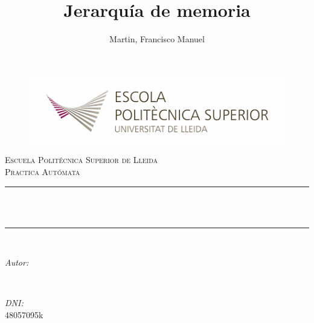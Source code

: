 \documentclass{article}
\title{Jerarquía de memoria}
\author{Martin, Francisco Manuel
}
\makeatletter
\let\thetitle\@title
\let\theauthor\@author
\let\thedate\@date
\makeatother
\begin{document}
    \begin{titlepage}
        \begin{figure}[h]

            \includegraphics[scale=0.38]{1}
        \end{figure}
        \centering
        \vspace*{0.5 cm}

        \textsc{\LARGE Escuela Politécnica Superior de Lleida}\\[2.0 cm]    %
        \textsc{\large Practica Autómata}\\[0.5 cm]                %
        \rule{\linewidth}{0.2 mm} \\[0.4 cm]
        { \huge \bfseries \thetitle}\\
        \rule{\linewidth}{0.2 mm} \\[1.5 cm]

        \begin{minipage}{0.4\textwidth}
            \begin{flushleft}
                \large
                \emph{Autor:}\\
                \theauthor
            \end{flushleft}
        \end{minipage}~
        \begin{minipage}{0.4\textwidth}
            \begin{flushright}
                \large
                \emph{DNI:} \\
                48057095k %
            \end{flushright}
        \end{minipage}\\[2 cm]

        {\large \thedate}\\[2 cm]

        \vfill

    \end{titlepage}
\end{document}
